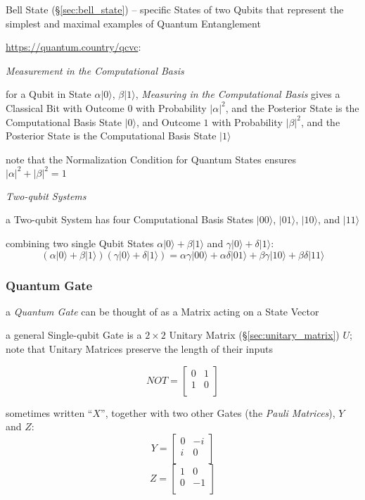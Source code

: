 \fist Bell State (\S\ref{sec:bell_state}) -- specific States of two Qubits that
represent the simplest and maximal examples of Quantum Entanglement

\url{https://quantum.country/qcvc}:

\emph{Measurement in the Computational Basis}

for a Qubit in State $\alpha|0\rangle$, $\beta|1\rangle$, \emph{Measuring in the
  Computational Basis} gives a Classical Bit with Outcome $0$ with Probability
$|\alpha|^2$, and the Posterior State is the Computational Basis State
$|0\rangle$, and Outcome $1$ with Probability $|\beta|^2$, and the Posterior
State is the Computational Basis State $|1\rangle$

note that the Normalization Condition for Quantum States ensures
$|\alpha|^2 + |\beta|^2 = 1$

\emph{Two-qubit Systems}

a Two-qubit System has four Computational Basis States $|00\rangle$,
$|01\rangle$, $|10\rangle$, and $|11\rangle$

combining two single Qubit States $\alpha|0\rangle + \beta|1\rangle$ and
$\gamma|0\rangle + \delta|1\rangle$:
\[
  (\alpha|0\rangle + \beta|1\rangle)(\gamma|0\rangle + \delta|1\rangle) =
    \alpha\gamma|00\rangle + \alpha\delta|01\rangle +
    \beta\gamma|10\rangle + \beta\delta|11\rangle
\]



\subsubsection{Quantum Gate}\label{sec:quantum_gate}

a \emph{Quantum Gate} can be thought of as a Matrix acting on a State Vector

a general Single-qubit Gate is a $2\times2$ Unitary Matrix
(\S\ref{sec:unitary_matrix}) $U$; note that Unitary Matrices preserve the length
of their inputs

\[
NOT =
  \begin{bmatrix}
    0 & 1 \\
    1 & 0 \\
  \end{bmatrix}
\]

sometimes written ``$X$'', together with two other Gates (the \emph{Pauli
  Matrices}), $Y$ and $Z$:
\[
Y =
  \begin{bmatrix}
    0 & -i \\
    i &  0 \\
  \end{bmatrix}
\] \[
Z =
  \begin{bmatrix}
    1 &  0 \\
    0 & -1 \\
  \end{bmatrix}
\]

